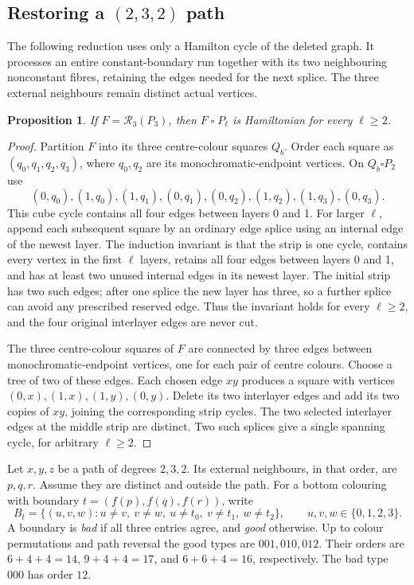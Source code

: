 \documentclass[11pt]{article}
\newtheorem{proposition}[theorem]{Proposition}
\theoremstyle{remark}
\newcommand{\R}{\mathcal R}
\numberwithin{equation}{section}
\numberwithin{table}{section}
\begin{document}
\subsection{\texorpdfstring{Restoring a $(2,3,2)$ path}{Restoring a (2,3,2) path}}
The following reduction uses only a Hamilton cycle of the deleted graph.
It processes an entire constant-boundary run together with its two
neighbouring nonconstant fibres, retaining the edges needed for the next
splice.  The three external neighbours remain distinct actual vertices.
\begin{proposition}\label{prop:badrun}
If $F=\R_3(P_3)$, then $F\mathbin{\square}P_\ell$ is Hamiltonian
for every $\ell\ge2$.
\end{proposition}
\begin{proof}
Partition $F$ into its three centre-colour squares $Q_b$.
Order each square as $(q_0,q_1,q_2,q_3)$, where $q_0,q_2$ are
its monochromatic-endpoint vertices. On $Q_b\square P_2$ use
\[
 (0,q_0),(1,q_0),(1,q_1),(0,q_1),
 (0,q_2),(1,q_2),(1,q_3),(0,q_3).
\]
This cube cycle contains all four edges between layers 0 and 1.
For larger $\ell$, append each subsequent square by an ordinary
edge splice using an internal edge of the newest layer.  The induction
invariant is that the strip is one cycle, contains every vertex in the
first $\ell$ layers, retains all four edges between layers 0 and 1,
and has at least two unused internal edges in its newest layer.  The
initial strip has two such edges; after one splice the new layer has
three, so a further splice can avoid any prescribed reserved edge.
Thus the invariant holds for every $\ell\ge2$, and the four original
interlayer edges are never cut.

The three centre-colour squares of $F$ are connected by three edges
between monochromatic-endpoint vertices, one for each pair of
centre colours. Choose a tree of two of these edges. Each chosen
edge $xy$ produces a square with vertices $(0,x),(1,x),(1,y),(0,y)$.
Delete its two interlayer edges and add its two copies of $xy$,
joining the corresponding strip cycles. The two selected interlayer
edges at the middle strip are distinct. Two such splices give a
single spanning cycle, for arbitrary $\ell\ge2$.
\end{proof}

Let $x,y,z$ be a path of degrees $2,3,2$.  Its external neighbours, in
that order, are $p,q,r$.  Assume they are distinct and outside the path.
For a bottom colouring with boundary $t=(f(p),f(q),f(r))$, write
\[
 B_t=\{(u,v,w):u\ne v,\ v\ne w,\ u\ne t_0,\ v\ne t_1,
                  \ w\ne t_2\},\qquad u,v,w\in\{0,1,2,3\}.
\]
A boundary is \emph{bad} if all three entries agree, and \emph{good}
otherwise. Up to colour permutations and path reversal the good types
are $001,010,012$. Their orders are $6+4+4=14$, $9+4+4=17$, and
$6+6+4=16$, respectively. The bad type $000$ has order $12$.
\end{document}
